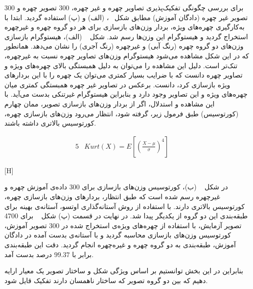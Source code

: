 برای بررسی چگونگی تفکیک‌پذیری تصاویر چهره و غیر چهره، 300 تصویر چهره و 300 تصویر غیر چهره (دادگان آموزش) مطابق شکل ~، (الف) و (پ) استفاده گردید. ابتدا با به‌کارگیری چهره‌های ویژه، بردار وزن‌های بازسازی برای هر دو گروه چهره و غیرچهره استخراج گردید و هیستوگرام این وزن‌ها رسم شد. شکل   ~ (الف)، هیستوگرام بازسازی وزن‌های دو گروه چهره (رنگ آبی) و غیرچهره (رنگ آجری) را نشان می‌دهد. همانطور که در این شکل مشاهده می‌شود هیستوگرام وزن‌های تصاویر چهره نسبت به غیرچهره، تنک‌تر است. دلیل این مشاهده را می‌توان به دلیل همبستگی بالای چهره‌های ویژه و تصاویر چهره دانست که با ضرایب بسیار کمتری می‌توان یک چهره را با این بردارهای ویژه بازسازی کرد، دانست. برعکس در تصاویر غیر چهره همبستگی کمتری میان چهره‌های ویژه و این تصاویر وجود دارد و بنابراین هیستوگرام غیرتنکی بدست می‌آید. با این مشاهده و استدلال، اگر از بردار وزن‌های بازسازی تصویر، ممان چهارم (کورتوسیس) طبق فرمول زیر، گرفته شود، انتظار می‌رود وزن‌های بازسازی چهره، کورتوسیس بالاتری داشته باشند.

\begin{alignat}{5}
	& Kurt(X) = E \left[\left(\frac{X-\mu}{\sigma}\right)^4\right] \label{kurtosis} && 
\end{alignat}


[H]


در شکل ~ (ب)، کورتوسیس وزن‌های بازسازی برای 300 داده‌‌ی آموزش چهره و غیرچهره رسم شده است که طبق انتظار، بردارهای وزن‌های بازسازی چهره، کورتوسیس بالاتری دارند. با استفاده از روش آستانه‌گذاری اوتسو، آستانه‌ی بهینه برای طبقه‌بندی این دو گروه از یکدیگر پیدا شد. در نهایت در قسمت (پ) شکل ~ برای 4700 تصویر آزمایش، با استفاده از چهره‌های ویژه‌ی استخراج شده در 300 تصویر آموزش، کورتوسیس وزن‌های بازسازی محاسبه گردید و با آستانه‌ی بدست آمده در دادگان آموزش، طبقه‌بندی به دو گروه چهره و غیره‌چهره انجام گردید. دقت این طبقه‌بندی برابر با $99.37$ درصد بدست آمد. 

بنابراین در این بخش توانستیم بر اساس ویژگی شکل و ساختار تصویر یک معیار ارایه دهیم که بین دو گروه تصویر که ساختار ناهمسان دارند تفکیک قایل شود.

